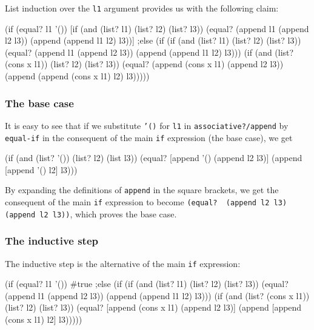 List induction over the \texttt{l1} argument provides us with
the following claim:

\begin{Snippet}
  (if (equal? l1 '())
      [if (and (list? l1) (list? l2) (list? l3))
          (equal? (append l1 (append l2 l3))
                  (append (append l1 l2) l3))]
  ;else
      (if (if (and (list? l1) (list? l2) (list? l3))
              (equal? (append l1 (append l2 l3))
                      (append (append l1 l2) l3)))
          (if (and (list? (cons x l1)) (list? l2) (list? l3))
              (equal? (append (cons x l1) (append l2 l3))
                      (append (append (cons x l1) l2) l3)))))  
\end{Snippet}

\subsubsection{The base case}

It is easy to see that if we substitute \texttt{'()} for
\texttt{l1} in \texttt{associative?/append} by \texttt{equal-if}
in the consequent of the main \texttt{if} expression (the base case), we get

\begin{Snippet}
  (if (and (list? '()) (list? l2) (list l3))
     (equal? [append '() (append l2 l3)]
             (append [append '() l2] l3)))
\end{Snippet}

By expanding the definitions of \texttt{append} in the square
brackets, we get the consequent of the main \texttt{if} expression
to become \texttt{(equal?\,\,(append l2 l3) (append l2 l3))}, which
proves the base case.

\subsubsection{The inductive step}

The inductive step is the alternative of the main \texttt{if}
expression:

\begin{Snippet}
  (if (equal? l1 '())
      #true
  ;else
    (if (if (and (list? l1) (list? l2) (list? l3))
            (equal? (append l1 (append l2 l3))
                    (append (append l1 l2) l3)))
        (if (and (list? (cons x l1)) (list? l2) (list? l3))
            (equal? [append (cons x l1) (append l2 l3)]
                    (append [append (cons x l1) l2] l3)))))  
\end{Snippet}


